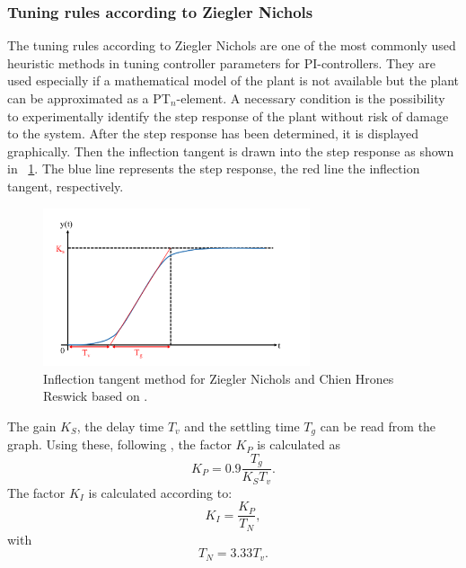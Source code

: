 \subsubsection{Tuning rules according to Ziegler Nichols}
The tuning rules according to Ziegler Nichols are one of the most commonly used heuristic methods in tuning controller parameters for PI-controllers. They are used especially if a mathematical model of the plant is not available but the plant can be approximated as a PT$_{n}$-element. \cite{Reg_17}
A necessary condition is the possibility to experimentally identify the step response of the plant without risk of damage to the system. After the step response has been determined, it is displayed graphically. Then the inflection tangent is drawn into the step response as shown in \figurename~\ref{fig:param_zn}. The blue line represents the step response, the red line the inflection tangent, respectively.
\begin{figure}
   \centering
   \includegraphics[width=0.7\textwidth]{images/param_zn.pdf}
   \caption[Inflection tangent method for Ziegler Nichols and Chien Hrones Reswick]{Inflection tangent method for Ziegler Nichols and Chien Hrones Reswick based on \cite{Reg_17}.}
   \label{fig:param_zn}
 \end{figure}
The gain $K_{S}$, the delay time $T_{v}$ and the settling time $T_{g}$ can be read from the graph.
Using these, following \cite{Reg_17}, the factor $K_{P}$ is calculated as
\begin{equation}
  K_{P} = 0.9\frac{T_{g}}{K_{S}T_{v}}.
\end{equation}
The factor $K_{I}$ is calculated according to:
\begin{equation}
    K_{I}  = \frac{K_{P}}{T_{N}},
 \label{eq:K_I}
\end{equation}
with
\begin{equation}
    T_{N}  = 3.33T_{v}.
 \label{eq:T_N}
\end{equation}
